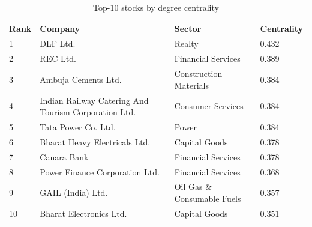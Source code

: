 \begin{table}[!ht]
\centering
\caption{Top-10 stocks by degree centrality}
\label{tab:top10-degree}
\begin{tabular}{llll}
\toprule
Rank & Company & Sector & Centrality \\
\midrule
1 & DLF Ltd. & Realty & 0.432 \\
2 & REC Ltd. & Financial Services & 0.389 \\
3 & Ambuja Cements Ltd. & Construction Materials & 0.384 \\
4 & Indian Railway Catering And Tourism Corporation Ltd. & Consumer Services & 0.384 \\
5 & Tata Power Co. Ltd. & Power & 0.384 \\
6 & Bharat Heavy Electricals Ltd. & Capital Goods & 0.378 \\
7 & Canara Bank & Financial Services & 0.378 \\
8 & Power Finance Corporation Ltd. & Financial Services & 0.368 \\
9 & GAIL (India) Ltd. & Oil Gas \& Consumable Fuels & 0.357 \\
10 & Bharat Electronics Ltd. & Capital Goods & 0.351 \\
\bottomrule
\end{tabular}
\end{table}
